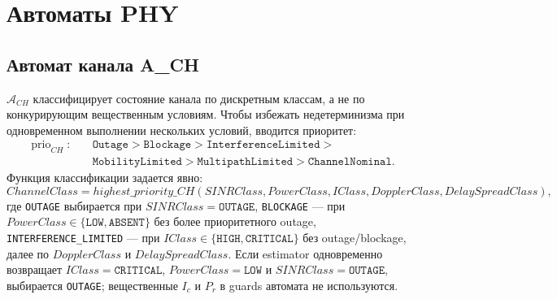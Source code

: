 \documentclass[10pt,a4paper]{article}
\newcommand{\code}[1]{\texttt{#1}}
\newcommand{\A}[1]{\mathcal{A}_{#1}}
\newcommand{\prio}{\operatorname{prio}}
\begin{document}
\section{Автоматы PHY}

\subsection{Автомат канала A\_CH}

\(\A{CH}\) классифицирует состояние канала по дискретным классам, а не по конкурирующим вещественным условиям. Чтобы избежать недетерминизма при одновременном выполнении нескольких условий, вводится приоритет:
\begin{equation}
\begin{aligned}
\prio_{CH}:\quad &\code{Outage}>\code{Blockage}>\code{InterferenceLimited}>\\
&\code{MobilityLimited}>\code{MultipathLimited}>\code{ChannelNominal}.
\end{aligned}
\end{equation}
Функция классификации задается явно:
\begin{equation}
ChannelClass=highest\_priority\_CH(SINRClass,PowerClass,IClass,DopplerClass,DelaySpreadClass),
\end{equation}
где \code{OUTAGE} выбирается при \(SINRClass=\code{OUTAGE}\), \code{BLOCKAGE} --- при \(PowerClass\in\{\code{LOW},\code{ABSENT}\}\) без более приоритетного outage, \code{INTERFERENCE\_LIMITED} --- при \(IClass\in\{\code{HIGH},\code{CRITICAL}\}\) без outage/blockage, далее по \(DopplerClass\) и \(DelaySpreadClass\). Если estimator одновременно возвращает \(IClass=\code{CRITICAL}\), \(PowerClass=\code{LOW}\) и \(SINRClass=\code{OUTAGE}\), выбирается \code{OUTAGE}; вещественные \(I_c\) и \(P_r\) в guards автомата не используются.
\end{document}
